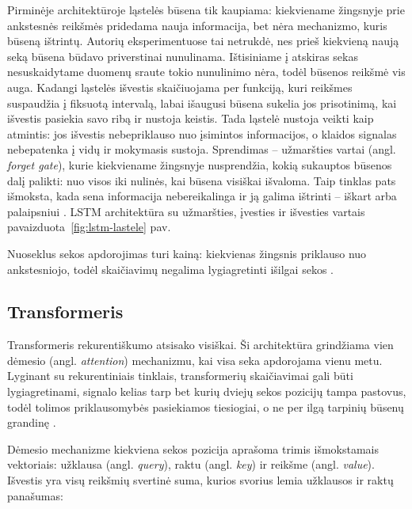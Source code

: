 Pirminėje architektūroje ląstelės būsena tik kaupiama: kiekviename žingsnyje prie ankstesnės reikšmės pridedama nauja informacija, bet nėra mechanizmo, kuris būseną ištrintų.
Autorių eksperimentuose tai netrukdė, nes prieš kiekvieną naują seką būsena būdavo priverstinai nunulinama.
Ištisiniame į atskiras sekas nesuskaidytame duomenų sraute tokio nunulinimo nėra, todėl būsenos reikšmė vis auga.
Kadangi ląstelės išvestis skaičiuojama per funkciją, kuri reikšmes suspaudžia į fiksuotą intervalą, labai išaugusi būsena sukelia jos prisotinimą, kai išvestis pasiekia savo ribą ir nustoja keistis.
Tada ląstelė nustoja veikti kaip atmintis: jos išvestis nebepriklauso nuo įsimintos informacijos, o klaidos signalas nebepatenka į vidų ir mokymasis sustoja\cite{gers2000}.
Sprendimas -- užmaršties vartai (angl. \textit{forget gate}), kurie kiekviename žingsnyje nusprendžia, kokią sukauptos būsenos dalį palikti: nuo visos iki nulinės, kai būsena visiškai išvaloma.
Taip tinklas pats išmoksta, kada sena informacija nebereikalinga ir ją galima ištrinti -- iškart arba palaipsniui \cite{gers2000}.
LSTM architektūra su užmaršties, įvesties ir išvesties vartais pavaizduota~\ref{fig:lstm-lastele} pav.



Nuoseklus sekos apdorojimas turi kainą: kiekvienas žingsnis priklauso nuo ankstesniojo, todėl skaičiavimų negalima lygiagretinti išilgai sekos \cite{vaswani2017}.


\subsection{Transformeris}

Transformeris \cite{vaswani2017} rekurentiškumo atsisako visiškai.
Ši architektūra grindžiama vien dėmesio (angl. \textit{attention}) mechanizmu, kai visa seka apdorojama vienu metu.
Lyginant su rekurentiniais tinklais, transformerių skaičiavimai gali būti lygiagretinami, signalo kelias tarp bet kurių dviejų sekos pozicijų tampa pastovus, todėl tolimos priklausomybės pasiekiamos tiesiogiai, o ne per ilgą tarpinių būsenų grandinę \cite{vaswani2017}.

Dėmesio mechanizme kiekviena sekos pozicija aprašoma trimis išmokstamais vektoriais: užklausa (angl. \textit{query}), raktu (angl. \textit{key}) ir reikšme (angl. \textit{value}).
Išvestis yra visų reikšmių svertinė suma, kurios svorius lemia užklausos ir raktų panašumas:

